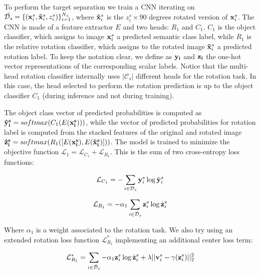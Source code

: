 \documentclass[10pt,twocolumn,letterpaper]{article}
\begin{document}
To perform the target separation we train a CNN iterating on $\tilde{\mathcal{D}_s} = \{({\bf x}_i^s, {\bf \tilde x}_i^s, z_i^s)\}_{i=1}^{N_s}$,
where ${\bf \tilde x}_i^s$ is the $z_i^s\times 90$ degrees rotated version of ${\bf x}_i^s$.
The CNN is made of a feature extractor $E$ and two heads: $R_1$ and $C_1$.
$C_1$ is the object classifier, which assigns to image ${\bf x}_i^s$ a predicted semantic class label,
while $R_1$ is the relative rotation classifier, which assigns to the rotated image ${\bf \tilde x}_i^s$ a predicted rotation label.
To keep the notation clear, we define as ${\bf y_i}$ and ${\bf z_i}$ the one-hot vector representations of the corresponding scalar labels.
Notice that the multi-head rotation classifier internally uses $|\mathcal{C}_s|$ different heads for the rotation task.
In this case, the head selected to perform the rotation prediction is up to the object classifier $C_1$ (during inference and not during training). 

The object class vector of predicted probabilities is computed as ${\bf \hat{y}_i^s} = softmax(C_1(E({\bf x_i^s})))$, while the vector of predicted probabilities
for rotation label is computed from the stacked features of the original and rotated image ${\bf \hat{z}_i^s} = softmax(R_1([E({\bf x_i^s}), E({\bf \tilde{x}_i^s})]))$.
The model is trained to minimize the objective function $\mathcal{L}_1 = \mathcal{L}_{C_1} + \mathcal{L}_{R_1}$.
This is the sum of two cross-entropy loss functions:

\begin{equation}
  \mathcal{L}_{C_1} = -\sum_{i\in\mathcal{D}_s} {\bf y}_i^s \log \hat{\bf y}_i^s
  \label{eq:baseloss_class}
\end{equation}

\begin{equation}
  \mathcal{L}_{R_1} = -\alpha_1\sum_{i\in\mathcal{\tilde{D}}_s} {\bf z}_i^s \log \hat{{\bf z}}_i^s
  \label{eq:baseloss_rot}
\end{equation}

Where $\alpha_1$ is a weight associated to the rotation task.
We also try using an extended rotation loss function $\mathcal{L}_{R_1}^*$ implementing an additional center loss\cite{CenterLoss} term:

\begin{equation}
  \mathcal{L}_{R_1}^* = \sum_{i\in\mathcal{\tilde{D}}_s} -\alpha_1{\bf z}_i^s \log \hat{{\bf z}}_i^s+\lambda||{\bf v}_i^s-\gamma({\bf z}_i^s)||_2^2
  \label{eq:center_loss}
\end{equation}
\end{document}
